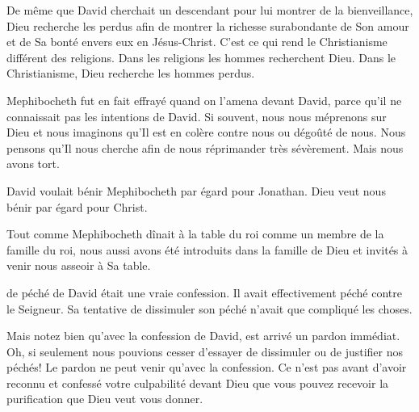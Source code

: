 De même que David cherchait un descendant pour lui montrer
 de la bienveillance, Dieu recherche les perdus afin de montrer
 la richesse surabondante de Son amour et de Sa bonté envers eux
 en Jésus-Christ. C'est ce qui rend le Christianisme différent des religions.
 Dans les religions les hommes recherchent Dieu.
 Dans le Christianisme, Dieu recherche les hommes perdus. 

Mephibocheth fut en fait effrayé quand on l'amena devant David,
 parce qu'il ne connaissait pas les intentions de David.
 Si souvent, nous nous méprenons sur Dieu et nous imaginons
 qu'Il est en colère contre nous ou dégoûté de nous.
 Nous pensons qu'Il nous cherche afin de nous réprimander très sévèrement.
 Mais nous avons tort. 

David voulait bénir Mephibocheth par égard pour Jonathan.
 Dieu veut nous bénir par égard pour Christ. 


Tout comme Mephibocheth dînait à la table du roi
 comme un membre de la famille du roi,
 nous aussi avons été introduits dans la famille de Dieu
 et invités à venir nous asseoir à Sa table. 

\dvrule






 de péché de David
 était une vraie confession.
 Il avait effectivement péché contre le Seigneur.
 Sa tentative de dissimuler son péché
 n'avait que compliqué les choses. 

Mais notez bien qu'avec la confession de David,
 est arrivé un pardon immédiat.
 Oh, si seulement nous pouvions cesser d'essayer de dissimuler
 ou de justifier nos péchés!
 Le pardon ne peut venir qu'avec la confession.
 Ce n'est pas avant d'avoir reconnu et confessé votre culpabilité
 devant Dieu que vous pouvez recevoir la purification
 que Dieu veut vous donner. 


